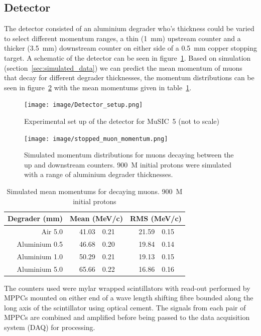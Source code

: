 \documentclass[]{article}
\begin{document}
\subsection{Detector} %
\label{sub:detector}
The detector consisted of an aluminium degrader who's thickness could be varied to select different momentum ranges, a thin (1~mm) upstream counter and a thicker (3.5~mm) downstream counter on either side of a 0.5~mm copper stopping target. A schematic of the detector can be seen in figure~\ref{fig:setup}. Based on simulation (section~\ref{sec:simulated_data}) we can predict the mean momentum of muons that decay for different degrader thicknesses, the momentum distributions can be seen in figure~\ref{fig:stopped_muon_mom} with the mean momentums given in table~\ref{tab:stopped_muon_mom}.
\begin{figure}[htbp]
    \centering
        \texttt{[image: image/Detector\_setup.png]}
    \caption{Experimental set up of the detector for MuSIC~5 (not to scale)}
    \label{fig:setup}
\end{figure}  
\begin{figure}[htbp]
    \centering
        \texttt{[image: image/stopped\_muon\_momentum.png]}
    \caption{Simulated momentum distributions for muons decaying between the up and downstream counters. 900~M initial protons were simulated with a range of aluminium degrader thicknesses.}
    \label{fig:stopped_muon_mom}
\end{figure}
\begin{table}
    \begin{center}
    \begin{tabular}{r|r@{ $\pm$ }l|r@{ $\pm$ }l} %
        Degrader (mm) & \multicolumn{2}{|c|}{Mean (MeV/c)} & \multicolumn{2}{|c}{RMS (MeV/c)}\\
        \hline
        Air 5.0       & 41.03 & 0.21 & 21.59 & 0.15 \\
        Aluminium 0.5 & 46.68 & 0.20 & 19.84 & 0.14 \\
        Aluminium 1.0 & 50.29 & 0.21 & 19.13 & 0.15 \\
        Aluminium 5.0 & 65.66 & 0.22 & 16.86 & 0.16 \\
    \end{tabular}
    \end{center}
    \caption{Simulated mean momentums for decaying muons. 900~M initial protons}
    \label{tab:stopped_muon_mom}
\end{table}

The counters used were mylar wrapped scintillators with read-out performed by MPPCs mounted on either end of a wave length shifting fibre bounded along the long axis of the scintillator using optical cement. The signals from each pair of MPPCs are combined and amplified before being passed to the data acquisition system (DAQ) for processing.
\end{document}
